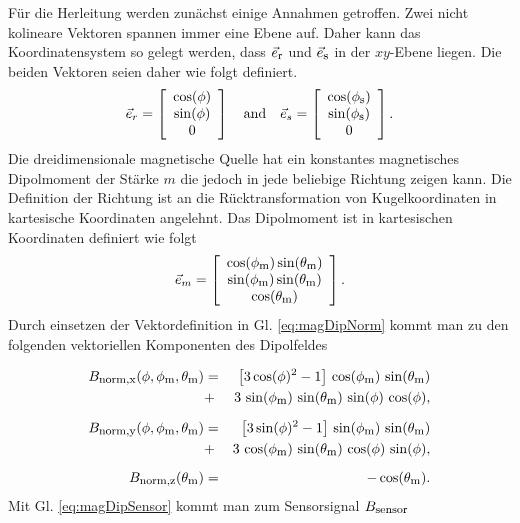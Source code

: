 Für die Herleitung werden zunächst einige Annahmen getroffen. Zwei nicht kolineare Vektoren spannen immer eine Ebene auf. Daher kann das Koordinatensystem so gelegt werden, dass $\vec{e}_{\textrm{\footnotesize{r}}}$ und $\vec{e}_{\textrm{\footnotesize{s}}}$ in der $xy$-Ebene liegen. Die beiden Vektoren seien daher wie folgt definiert.
\begin{equation}
    \vec{e}_r = \left[\begin{array}{c} \cos(\phi)\\ \sin(\phi) \\ 0\end{array}\right] \quad \textrm{and} \quad
    \vec{e}_s = \left[\begin{array}{c} \cos(\phi_{\textrm{\footnotesize{s}}})\\ \sin(\phi_{\textrm{\footnotesize{s}}}) \\ 0\end{array}\right].
    \label{eq:defErEs}
\end{equation}
Die dreidimensionale magnetische Quelle hat ein konstantes magnetisches Dipolmoment der Stärke $m$ die jedoch in jede beliebige Richtung zeigen kann. Die Definition der Richtung ist an die Rücktransformation von Kugelkoordinaten in kartesische Koordinaten angelehnt. Das Dipolmoment ist in kartesischen Koordinaten definiert wie folgt
\begin{equation}
    \vec{e}_m = \left[\begin{array}{c} \cos(\phi_{\textrm{\footnotesize{m}}})\sin(\theta_{\textrm{\footnotesize{m}}})\\ \sin(\phi_{\textrm{\footnotesize{m}}})\sin(\theta_{\textrm{\footnotesize{m}}}) \\ \cos(\theta_{\textrm{\footnotesize{m}}}) \end{array}\right].
    \label{eq:defEm}
 \end{equation}
Durch einsetzen der Vektordefinition in Gl. \ref{eq:magDipNorm} kommt man zu den folgenden vektoriellen Komponenten des Dipolfeldes

 \begin{eqnarray}
    B_{\textrm{\footnotesize{norm,x}}}(\phi,\phi_{\textrm{\footnotesize{m}}},\theta_{\textrm{\footnotesize{m}}})&=&\big[3\cos(\phi)^2-1\big]\,\cos(\phi_{\textrm{\footnotesize{m}}})\,\sin(\theta_{\textrm{\footnotesize{m}}}) \nonumber \\ &+&  3 \,\sin(\phi_{\textrm{\footnotesize{m}}})\,\sin(\theta_{\textrm{\footnotesize{m}}})\,\sin(\phi)\,\cos(\phi),
    \label{eq:magNormX} \\[2mm]
    B_{\textrm{\footnotesize{norm,y}}}(\phi,\phi_{\textrm{\footnotesize{m}}},\theta_{\textrm{\footnotesize{m}}})&=&\big[3\sin(\phi)^2-1\big]\,\sin(\phi_{\textrm{\footnotesize{m}}})\,\sin(\theta_{\textrm{\footnotesize{m}}}) \nonumber\\ &+& 3 \,\cos(\phi_{\textrm{\footnotesize{m}}})\,\sin(\theta_{\textrm{\footnotesize{m}}})\,\cos(\phi)\,\sin(\phi),
    \label{eq:magNormY} \\[2mm]
    B_{\textrm{\footnotesize{norm,z}}}(\theta_{\textrm{\footnotesize{m}}}) &=& - \cos(\theta_{\textrm{\footnotesize{m}}}).
    \label{eq:magNormZ}
\end{eqnarray}
Mit Gl. \ref{eq:magDipSensor} kommt man zum Sensorsignal $B_{\textrm{\footnotesize{sensor}}}$

